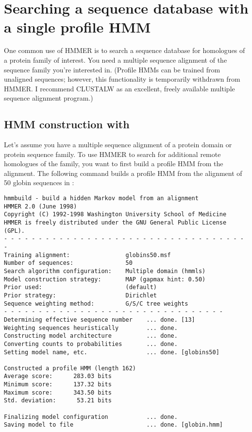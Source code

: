 \section{Searching a sequence database with a single profile HMM}

One common use of HMMER is to search a sequence database for
homologues of a protein family of interest. You need a multiple
sequence alignment of the sequence family you're interested in.
(Profile HMMs can be trained from unaligned sequences; however, this
functionality is temporarily withdrawn from HMMER. I recommend
CLUSTALW as an excellent, freely available multiple sequence alignment
program.)

\subsection{HMM construction with }

Let's assume you have a multiple sequence alignment of a protein
domain or protein sequence family. To use HMMER to search for
additional remote homologues of the family, you want to first build a
profile HMM from the alignment. The following command builds a profile
HMM from the alignment of 50 globin sequences in :

\vspace{1.5em}
\vspace{-1.5em}
{\small\begin{verbatim}
hmmbuild - build a hidden Markov model from an alignment
HMMER 2.0 (June 1998)
Copyright (C) 1992-1998 Washington University School of Medicine
HMMER is freely distributed under the GNU General Public License (GPL).
- - - - - - - - - - - - - - - - - - - - - - - - - - - - - - - - - - - -
Training alignment:                globins50.msf
Number of sequences:               50
Search algorithm configuration:    Multiple domain (hmmls)
Model construction strategy:       MAP (gapmax hint: 0.50)
Prior used:                        (default)
Prior strategy:                    Dirichlet
Sequence weighting method:         G/S/C tree weights
- - - - - - - - - - - - - - - - - - - - - - - - - - - - - - - -
Determining effective sequence number    ... done. [13]
Weighting sequences heuristically        ... done.
Constructing model architecture          ... done.
Converting counts to probabilities       ... done.
Setting model name, etc.                 ... done. [globins50]

Constructed a profile HMM (length 162)
Average score:      283.03 bits
Minimum score:      137.32 bits
Maximum score:      343.50 bits
Std. deviation:      53.21 bits

Finalizing model configuration           ... done.
Saving model to file                     ... done. [globin.hmm]
\end{verbatim}}

